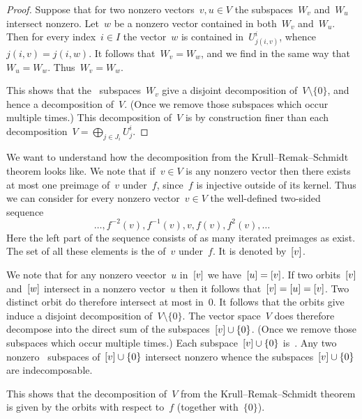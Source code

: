 \documentclass[a4paper,11pt]{scrartcl}
\begin{document}
\begin{proof}
  Suppose that for two nonzero vectors~$v, u \in V$ the subspaces~$W_v$ and~$W_u$ intersect nonzero.
  Let~$w$ be a nonzero vector contained in both~$W_v$ and~$W_u$.
  Then for every index~$i \in I$ the vector~$w$ is contained in~$U^i_{j(i,v)}$, whence~$j(i,v) = j(i,w)$.
  It follows that~$W_v = W_w$, and we find in the same way that~$W_u = W_w$.
  Thus~$W_v = W_w$.

  This shows that the~ subspaces~$W_v$ give a disjoint decomposition of~$V \setminus \{0\}$, and hence a decomposition of~$V$.
  (Once we remove those subspaces which occur multiple times.)
  This decomposition of~$V$ is by construction finer than each decomposition~$V = \bigoplus_{j \in J_i} U^i_j$.
\end{proof}

We want to understand how the decomposition from the Krull--Remak--Schmidt theorem looks like.
We note that if~$v \in V$ is any nonzero vector then there exists at most one preimage of~$v$ under~$f$, since~$f$ is injective outside of its kernel.
Thus we can consider for every nonzero vector~$v \in V$ the well-defined two-sided sequence
\[
  \dotsc, f^{-2}(v), f^{-1}(v), v, f(v), f^2(v), \dotsc
\]
Here the left part of the sequence consists of as many iterated preimages as exist.
The set of all these elements is the  of~$v$ under~$f$.
It is denoted by~$[v]$.

We note that for any nonzero veector~$u$ in~$[v]$ we have~$[u] = [v]$.
If two orbits~$[v]$ and~$[w]$ intersect in a nonzero vector~$u$ then it follows that~$[v] = [u] = [v]$.
Two distinct orbit do therefore intersect at most in~$0$.
It follows that the orbits give induce a disjoint decomposition of~$V \setminus \{0\}$.
The vector space~$V$ does therefore decompose into the direct sum of the subspaces~$[v] \cup \{ 0 \}$.
(Once we remove those subspaces which occur multiple times.)
Each subspace~$[v] \cup \{ 0 \}$ is~.
Any two nonzero~ subspaces of~$[v] \cup \{ 0 \}$ intersect nonzero whence the subspaces~$[v] \cup \{ 0 \}$ are indecomposable.

This shows that the decomposition of~$V$ from the Krull--Remak--Schmidt theorem is given by the orbits with respect to~$f$ (together with~$\{ 0 \}$).
\end{document}
